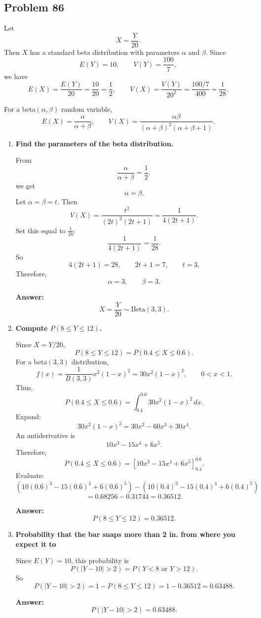 \documentclass[11pt]{article}
\begin{document}
\subsection*{Problem 86}

Let
\[
X=\frac{Y}{20}.
\]
Then $X$ has a standard beta distribution with parameters $\alpha$ and $\beta$. Since
\[
E(Y)=10,\qquad V(Y)=\frac{100}{7},
\]
we have
\[
E(X)=\frac{E(Y)}{20}=\frac{10}{20}=\frac12,
\qquad
V(X)=\frac{V(Y)}{20^2}=\frac{100/7}{400}=\frac{1}{28}.
\]

For a beta$(\alpha,\beta)$ random variable,
\[
E(X)=\frac{\alpha}{\alpha+\beta},
\qquad
V(X)=\frac{\alpha\beta}{(\alpha+\beta)^2(\alpha+\beta+1)}.
\]

\begin{enumerate}
    \item[(a)] \textbf{Find the parameters of the beta distribution.}

    From
    \[
    \frac{\alpha}{\alpha+\beta}=\frac12,
    \]
    we get
    \[
    \alpha=\beta.
    \]
    Let $\alpha=\beta=t$. Then
    \[
    V(X)=\frac{t^2}{(2t)^2(2t+1)}=\frac{1}{4(2t+1)}.
    \]
    Set this equal to $\frac{1}{28}$:
    \[
    \frac{1}{4(2t+1)}=\frac{1}{28}.
    \]
    So
    \[
    4(2t+1)=28,
    \qquad
    2t+1=7,
    \qquad
    t=3.
    \]
    Therefore,
    \[
    \alpha=3,\qquad \beta=3.
    \]

    \textbf{Answer:}
    \[
    X=\frac{Y}{20}\sim \mathrm{Beta}(3,3).
    \]

    \item[(b)] \textbf{Compute $P(8\le Y\le 12)$.}

    Since $X=Y/20$,
    \[
    P(8\le Y\le 12)=P\left(0.4\le X\le 0.6\right).
    \]
    For a beta$(3,3)$ distribution,
    \[
    f(x)=\frac{1}{B(3,3)}x^{2}(1-x)^2=30x^2(1-x)^2,\qquad 0<x<1.
    \]
    Thus,
    \[
    P(0.4\le X\le 0.6)=\int_{0.4}^{0.6}30x^2(1-x)^2\,dx.
    \]
    Expand:
    \[
    30x^2(1-x)^2=30x^2-60x^3+30x^4.
    \]
    An antiderivative is
    \[
    10x^3-15x^4+6x^5.
    \]
    Therefore,
    \[
    P(0.4\le X\le 0.6)=\left[10x^3-15x^4+6x^5\right]_{0.4}^{0.6}.
    \]
    Evaluate:
    \[
    \left(10(0.6)^3-15(0.6)^4+6(0.6)^5\right)
    -
    \left(10(0.4)^3-15(0.4)^4+6(0.4)^5\right)
    \]
    \[
    =0.68256-0.31744=0.36512.
    \]

    \textbf{Answer:}
    \[
    P(8\le Y\le 12)=0.36512.
    \]

    \item[(c)] \textbf{Probability that the bar snaps more than 2 in. from where you expect it to}

    Since $E(Y)=10$, this probability is
    \[
    P(|Y-10|>2)=P(Y<8\text{ or }Y>12).
    \]
    So
    \[
    P(|Y-10|>2)=1-P(8\le Y\le 12)=1-0.36512=0.63488.
    \]

    \textbf{Answer:}
    \[
    P(|Y-10|>2)=0.63488.
    \]
\end{enumerate}
\end{document}
